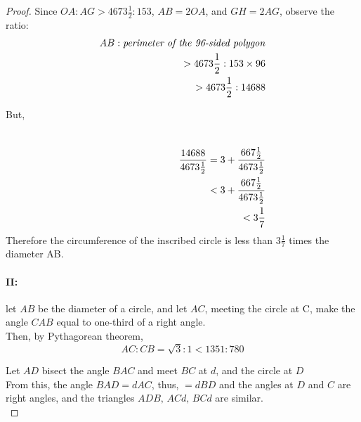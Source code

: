 \documentclass{article}
\begin{document}
\begin{proof}
    Since $OA : AG > 4673\frac{1}{2}:153$, $AB=2OA$, and $GH=2AG$, observe the ratio:
    \begin{align*}
        AB : \text{\textit{perimeter of the 96-sided polygon}}\\
        >4673\frac{1}{2}:153 \times96\\
        >4673\frac{1}{2}:14688\\
    \end{align*}
    \begin{center}
        But,
    \end{center}
    \begin{align*}
        \hphantom{AB : \text{\textit{perimeter of the 96-sided polygon}}}\\
        \frac{14688}{4673\frac{1}{2}} = 3 + \frac{667\frac{1}{2}}{4673\frac{1}{2}}\\
        <3+ \frac{667\frac{1}{2}}{4673\frac{1}{2}}\\
        <3\frac{1}{7}  
    \end{align*}
    Therefore the circumference of the inscribed circle is less than $3\frac{1}{7}$ times the diameter AB.

\paragraph{II:} \label{prt:2}
let $AB$ be the diameter of a circle, and let $AC$, meeting the circle at C, make the angle $CAB$ equal to one-third of a right angle.\\

    Then, by Pythagorean theorem,
    \[AC:CB = \sqrt{3} :1 \boldsymbol{<} 1351:780\]

    Let $AD$ bisect the angle $BAC$ and meet $BC$ at $d$, and the circle at $D$\\

    From this, the angle $BAD = dAC$, thus, $=dBD$ and the angles at $D$ and $C$ are right angles, and the triangles $ADB, \,ACd, \,BCd$ are similar. \\


\end{proof}
\end{document}
